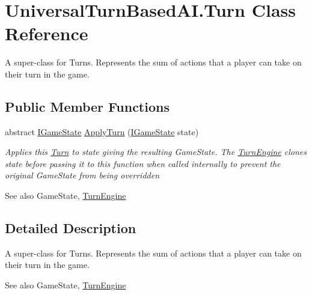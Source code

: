 \hypertarget{class_universal_turn_based_a_i_1_1_turn}{}\section{Universal\+Turn\+Based\+A\+I.\+Turn Class Reference}
\label{class_universal_turn_based_a_i_1_1_turn}


A super-\/class for Turns. Represents the sum of actions that a player can take on their turn in the game.  


\subsection*{Public Member Functions}
\begin{DoxyCompactItemize}
\item 
abstract \hyperlink{interface_universal_turn_based_a_i_1_1_i_game_state}{I\+Game\+State} \hyperlink{class_universal_turn_based_a_i_1_1_turn_a067fcf6397f7f0e6e8739090ecc9c873}{Apply\+Turn} (\hyperlink{interface_universal_turn_based_a_i_1_1_i_game_state}{I\+Game\+State} state)
\begin{DoxyCompactList}\small\item\em Applies this \hyperlink{class_universal_turn_based_a_i_1_1_turn}{Turn} to {\itshape state}  giving the resulting Game\+State. The \hyperlink{class_universal_turn_based_a_i_1_1_turn_engine}{Turn\+Engine} clones {\itshape state}  before passing it to this function when called internally to prevent the original Game\+State from being overridden \begin{DoxySeeAlso}{See also}
Game\+State, \hyperlink{class_universal_turn_based_a_i_1_1_turn_engine}{Turn\+Engine}


\end{DoxySeeAlso}
\end{DoxyCompactList}\end{DoxyCompactItemize}


\subsection{Detailed Description}
A super-\/class for Turns. Represents the sum of actions that a player can take on their turn in the game. 

\begin{DoxySeeAlso}{See also}
Game\+State, \hyperlink{class_universal_turn_based_a_i_1_1_turn_engine}{Turn\+Engine}


\end{DoxySeeAlso}


